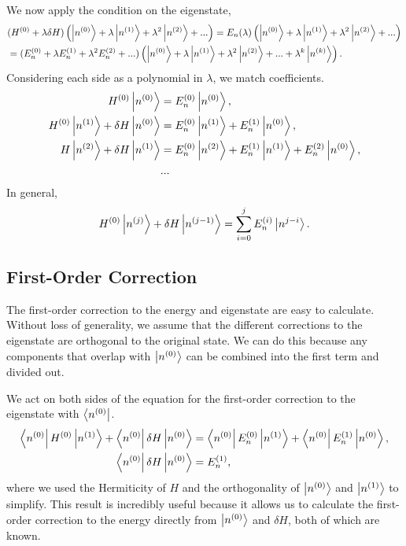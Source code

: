 We now apply the condition on the eigenstate,
\begin{align*}
&(H^{(0)} + \lambda \delta H) \left(\left| n^{(0)} \right\rangle + \lambda \left| n^{(1)} \right\rangle +  \lambda^2 \left| n^{(2)} \right\rangle + ... \right) = E_n (\lambda) \left(\left| n^{(0)} \right\rangle + \lambda \left| n^{(1)} \right\rangle +  \lambda^2 \left| n^{(2)} \right\rangle + ... \right) \\
&= (E_n^{(0)} + \lambda E_n^{(1)} + \lambda^2 E_n^{(2)} + ...)\left(\left| n^{(0)} \right\rangle + \lambda \left| n^{(1)} \right\rangle +  \lambda^2 \left| n^{(2)} \right\rangle + ... +  \lambda^k \left| n^{(k)} \right\rangle\right).
\end{align*}
Considering each side as a polynomial in $\lambda$, we match coefficients. 
\begin{align}
H^{(0)} \left| n^{(0)} \right\rangle &= E_n^{(0)} \left| n^{(0)} \right\rangle, \label{eq:0} \\
H^{(0)} \left| n^{(1)} \right\rangle + \delta H \left| n^{(0)} \right\rangle &= E_n^{(0)} \left| n^{(1)} \right\rangle + E_n^{(1)} \left| n^{(0)} \right\rangle, \label{eq:1} \\
H \left| n^{(2)} \right\rangle + \delta H \left| n^{(1)} \right\rangle &= E_n^{(0)} \left| n^{(2)} \right\rangle + E_n^{(1)} \left| n^{(1)} \right\rangle + E_n^{(2)} \left| n^{(0)} \right\rangle, \label{eq:2} \\
&...\nonumber
\end{align} In general,
\begin{equation} H^{(0)} \left| n^{(j)} \right\rangle + \delta H \left| n^{(j-1)} \right\rangle = \sum_{i=0}^{j} E_n^{(i)} \left| n^{j-i} \right\rangle.
\label{eq:gennondegen}
\end{equation}
\subsection*{First-Order Correction}
The first-order correction to the energy and eigenstate are easy to calculate. Without loss of generality, we assume that the different corrections to the eigenstate are orthogonal to the original state. We can do this because any components that overlap with $\left| n^{(0)} \right\rangle$ can be combined into the first term and divided out.

We act on both sides of the equation for the first-order correction to the eigenstate with $ \left\langle n^{(0)} \right|$.
\begin{align}
\left\langle n^{(0)} \right|H^{(0)} \left| n^{(1)} \right\rangle + \left\langle n^{(0)} \right|\delta H \left| n^{(0)} \right\rangle &= \left\langle n^{(0)} \right|E_n^{(0)} \left| n^{(1)} \right\rangle + \left\langle n^{(0)} \right|E_n^{(1)}  \left| n^{(0)} \right\rangle, \nonumber \\
\left\langle n^{(0)} \right|\delta H \left| n^{(0)} \right\rangle &= E_n^{(1)} , \label{eq:nondegen1}
\end{align}
where we used the Hermiticity of $H$ and the orthogonality of $\left| n^{(0)} \right\rangle$ and $\left| n^{(1)} \right\rangle$ to simplify. This result is incredibly useful because it allows us to calculate the first-order correction to the energy directly from $\left| n^{(0)} \right\rangle$ and $\delta H$, both of which are known.

